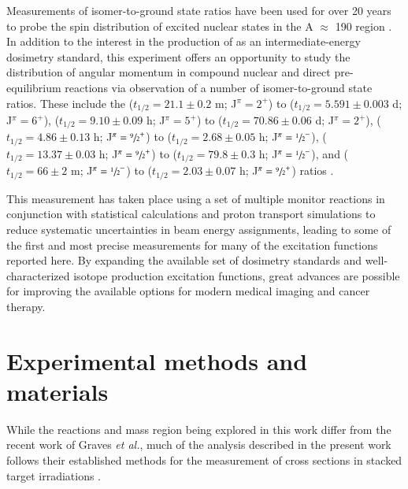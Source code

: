 \documentclass[3p]{elsarticle}
\newcommand{\etal}{\emph{et al.}}
\begin{document}
  
Measurements of isomer-to-ground state ratios have been used for over 20 years to probe the spin distribution of excited nuclear states in the A $\approx$ 190 region \cite{PhysRevC.73.034613,PhysRevC.45.1171}.
In addition to the interest in the production of  as an intermediate-energy dosimetry standard, this experiment offers an opportunity to study the distribution of angular momentum in compound nuclear and direct pre-equilibrium reactions via observation of a number of isomer-to-ground state ratios.
These include the  ($t_{1/2}=21.1\pm0.2$ m; J$^\pi=2^+$) to   ($t_{1/2}=5.591\pm0.003$ d; J$^\pi=6^+$),  ($t_{1/2}=9.10\pm0.09$ h; J$^\pi=5^+$) to   ($t_{1/2}=70.86\pm0.06$ d; J$^\pi=2^+$),   ($t_{1/2}=4.86\pm0.13$ h; J$^\pi=\sfrac{9}{2}^+$) to   ($t_{1/2}=2.68\pm0.05$ h; J$^\pi=\sfrac{1}{2}^-$),   ($t_{1/2}=13.37\pm0.03$ h; J$^\pi=\sfrac{9}{2}^+$) to   ($t_{1/2}=79.8\pm0.3$ h; J$^\pi=\sfrac{1}{2}^-$),  and  ($t_{1/2}=66\pm2$ m; J$^\pi=\sfrac{1}{2}^-$) to   ($t_{1/2}=2.03\pm0.07$ h; J$^\pi=\sfrac{9}{2}^+$)  ratios \cite{Dong2015,Nesaraja2010,Singh2014,Johnson2015,Singh2013}.  
 
 
This measurement has taken place using a set of multiple monitor reactions in conjunction with statistical calculations and proton transport simulations to reduce systematic uncertainties in beam energy assignments, leading to some of the first and most precise measurements  for many of the excitation functions reported here. 
By expanding the available set of dosimetry standards and well-characterized isotope production excitation functions, great advances are possible for improving the  available options for modern medical imaging and cancer therapy.

 
 
 


\section{Experimental methods and materials}\label{sec:experiment}


While the reactions and mass region being explored in this work differ from the recent work of Graves \etal, much of the analysis described in the present work follows their established methods for the measurement of cross sections in stacked target irradiations   \cite{Graves2016}.
\end{document}
